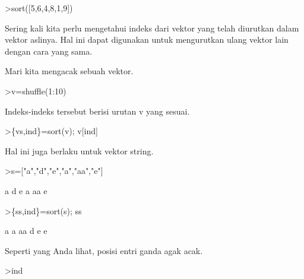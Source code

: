 \documentclass{article}
\newenvironment{eulernotebook}{\par}{\par}
\newenvironment{eulercomment}{\par\medskip}{\par\medskip}
\begin{document}
\begin{eulernotebook}
\begin{eulercomment}
\begin{eulercomment}
\begin{eulercomment}
\begin{eulercomment}
\begin{eulercomment}
\begin{eulercomment}
\begin{eulerprompt}
>sort([5,6,4,8,1,9])
\end{eulerprompt}
\begin{euleroutput}
  [1,  4,  5,  6,  8,  9]
\end{euleroutput}
\begin{eulercomment}
Sering kali kita perlu mengetahui indeks dari vektor yang telah
diurutkan dalam vektor aslinya. Hal ini dapat digunakan untuk
mengurutkan ulang vektor lain dengan cara yang sama.

Mari kita mengacak sebuah vektor.
\end{eulercomment}
\begin{eulerprompt}
>v=shuffle(1:10)
\end{eulerprompt}
\begin{euleroutput}
  [4,  5,  10,  6,  8,  9,  1,  7,  2,  3]
\end{euleroutput}
\begin{eulercomment}
Indeks-indeks tersebut berisi urutan v yang sesuai.
\end{eulercomment}
\begin{eulerprompt}
>\{vs,ind\}=sort(v); v[ind]
\end{eulerprompt}
\begin{euleroutput}
  [1,  2,  3,  4,  5,  6,  7,  8,  9,  10]
\end{euleroutput}
\begin{eulercomment}
Hal ini juga berlaku untuk vektor string.
\end{eulercomment}
\begin{eulerprompt}
>s=["a","d","e","a","aa","e"]
\end{eulerprompt}
\begin{euleroutput}
  a
  d
  e
  a
  aa
  e
\end{euleroutput}
\begin{eulerprompt}
>\{ss,ind\}=sort(s); ss
\end{eulerprompt}
\begin{euleroutput}
  a
  a
  aa
  d
  e
  e
\end{euleroutput}
\begin{eulercomment}
Seperti yang Anda lihat, posisi entri ganda agak acak.
\end{eulercomment}
\begin{eulerprompt}
>ind
\end{eulerprompt}
\begin{euleroutput}
  [4,  1,  5,  2,  6,  3]
\end{euleroutput}

\end{eulercomment}
\end{eulercomment}
\end{eulercomment}
\end{eulercomment}
\end{eulercomment}
\end{eulercomment}
\end{eulernotebook}
\end{document}
